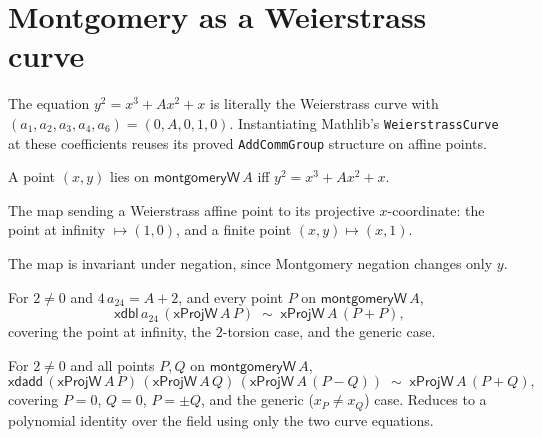 \section{Montgomery as a Weierstrass curve}

\begin{definition}
  \label{def:montgomeryW}
  \leanok
  The equation $y^2 = x^3 + A x^2 + x$ is literally the Weierstrass curve
  with $(a_1,a_2,a_3,a_4,a_6) = (0, A, 0, 1, 0)$. Instantiating Mathlib's
  \texttt{WeierstrassCurve} at these coefficients reuses its proved
  \texttt{AddCommGroup} structure on affine points.
\end{definition}

\begin{lemma}
  \label{lem:montgomeryW-equation}
  \leanok
  A point $(x,y)$ lies on $\mathsf{montgomeryW}\,A$ iff
  $y^2 = x^3 + A x^2 + x$.
\end{lemma}

\begin{definition}
  \label{def:xprojW}
  \leanok
  The map sending a Weierstrass affine point to its projective
  $x$-coordinate: the point at infinity $\mapsto (1,0)$, and a finite
  point $(x,y) \mapsto (x,1)$.
\end{definition}

The map is invariant under negation, since Montgomery negation changes only $y$.

\begin{theorem}
  \label{thm:xdbl-spec-w}
  \leanok
  For $2 \neq 0$ and $4\,a_{24} = A + 2$, and every point $P$ on
  $\mathsf{montgomeryW}\,A$,
  \[
    \mathsf{xdbl}\,a_{24}\,(\mathsf{xProjW}\,A\,P)
      \;\sim\; \mathsf{xProjW}\,A\,(P+P),
  \]
  covering the point at infinity, the $2$-torsion case, and the generic
  case.
\end{theorem}

\begin{theorem}
  \label{thm:xdadd-spec-w}
  \leanok
  For $2 \neq 0$ and all points $P, Q$ on $\mathsf{montgomeryW}\,A$,
  \[
    \mathsf{xdadd}\,(\mathsf{xProjW}\,A\,P)\,(\mathsf{xProjW}\,A\,Q)\,
      (\mathsf{xProjW}\,A\,(P-Q))
      \;\sim\; \mathsf{xProjW}\,A\,(P+Q),
  \]
  covering $P = 0$, $Q = 0$, $P = \pm Q$, and the generic
  ($x_P \neq x_Q$) case. Reduces to a polynomial identity over the field
  using only the two curve equations.
\end{theorem}

